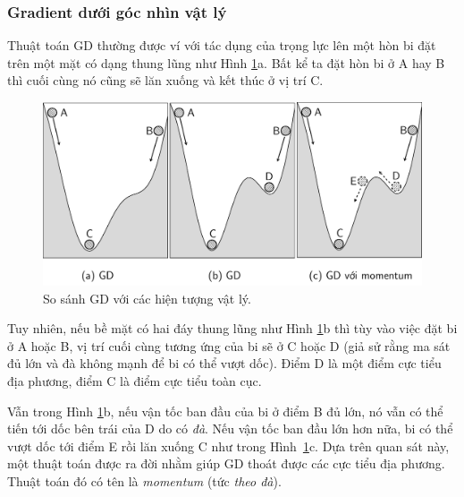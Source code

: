 \subsubsection{Gradient dưới góc nhìn vật lý }

Thuật toán GD thường được ví với tác dụng của trọng lực lên một hòn bi đặt trên
một mặt có dạng thung lũng như Hình \ref{fig:8_1}a. Bất kể ta đặt hòn bi ở A
hay B thì cuối cùng nó cũng sẽ lăn xuống và kết thúc ở vị trí C.

\begin{figure}[t]
\centering
\includegraphics[width = \textwidth]{Chapters/04_GradientDescent/GD/latex/momentum_bw.pdf}
\caption[]{So sánh GD với các hiện tượng vật lý.}
\label{fig:8_1}
\end{figure}
Tuy nhiên, nếu bề mặt có hai đáy thung lũng như Hình \ref{fig:8_1}b thì tùy
vào việc đặt bi ở A hoặc B, vị trí cuối cùng tương ứng của bi sẽ ở C hoặc D (giả
sử rằng ma sát đủ lớn và đà không mạnh để bi có thể vượt dốc). Điểm D
là một điểm cực tiểu địa phương, điểm C là điểm cực tiểu toàn cục.

Vẫn trong Hình \ref{fig:8_1}b, nếu vận tốc ban đầu của bi ở điểm B đủ lớn, nó
vẫn có thể tiến tới dốc bên trái của D do có \textit{đà}. Nếu vận tốc
ban đầu lớn hơn nữa, bi có thể vượt dốc tới điểm E rồi lăn xuống C như trong
Hình~\ref{fig:8_1}c. Dựa trên quan sát này, một thuật toán được ra đời nhằm giúp
GD thoát được các cực tiểu địa phương. Thuật toán đó có tên là \textit{momentum}
(tức \textit{theo đà}).

